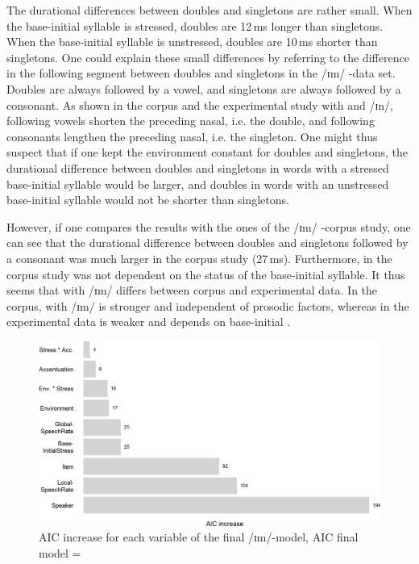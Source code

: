 The durational differences between doubles and singletons are rather small.  When the base-initial syllable is stressed, doubles are 12\,ms longer than singletons. When the base-initial syllable is unstressed, doubles are 10\,ms shorter than singletons. 
  One could explain these small differences by referring to the difference in the following segment between doubles and singletons in the /ɪm/ -data set. Doubles are always followed by a vowel, and singletons are always followed by a consonant. As shown in the corpus and the experimental study with  and /ɪn/, following vowels shorten the preceding nasal, i.e. the double, and following consonants lengthen the preceding nasal, i.e. the singleton. One might thus suspect that if one kept the environment constant for doubles and singletons, the durational difference between doubles and singletons in words with a stressed base-initial syllable would be larger, and doubles in words with an unstressed base-initial syllable would not be shorter than singletons. 

However, if one compares the results with the ones of the /ɪm/ -corpus study, one can see that the durational difference between doubles and singletons followed by a consonant was much larger in the corpus study (27\,ms). Furthermore, in the corpus study  was not dependent on the  status of the base-initial syllable.
It thus seems that  with /ɪm/  differs between corpus and experimental data. In the corpus,  with /ɪm/  is stronger and independent of prosodic factors, whereas in the experimental data  is weaker and depends on base-initial .


\begin{figure}
	\includegraphics[scale=0.7]{images/Experiment/AICdecreaseImComplex.png}
	\caption{AIC increase for each variable of the final /ɪm/-model, AIC final model = }
	\label{fig:Effectsize im experiment}
\end{figure}

